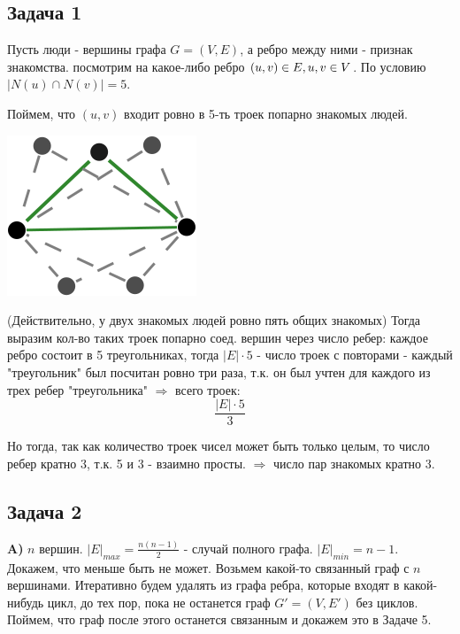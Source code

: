 \documentclass{article}
\begin{document}
\begin{center}
	\subsection*{Задача 1}
\end{center}

Пусть люди - вершины графа $ G = (V, E) $, а ребро между ними - признак знакомства.
посмотрим на какое-либо ребро $ (u, v) \in E, \space u, v \in V $. По условию $ |N(u) \cap N(v)| = 5$.

Поймем, что $ (u, v) $ входит ровно в 5-ть троек попарно знакомых людей.

\includegraphics[scale=0.5]{1_1.png}

(Действительно, у двух знакомых людей ровно пять общих знакомых)
Тогда выразим кол-во таких троек попарно соед. вершин через число ребер: каждое ребро состоит в 5 треугольниках, тогда $|E| \cdot 5$ - число троек с повторами - каждый "треугольник" был посчитан ровно три раза, т.к. он был учтен для каждого из трех ребер "треугольника" $\Rightarrow$ всего троек:
$$ \frac{|E| \cdot 5}{3}$$

Но тогда, так как количество троек чисел может быть только целым, то число ребер кратно 3, т.к. 5 и 3 - взаимно просты. $ \Rightarrow $ число пар знакомых кратно 3.   
 
 \begin{center}
 	\subsection*{Задача 2}
 \end{center}
 
 \textbf{A)} $ n $ вершин. $ |E|_{max} = \frac{n(n - 1)}{2} $ - случай полного графа.
 $ |E|_{min} = n - 1 $. Докажем, что меньше быть не может.
 Возьмем какой-то связанный граф с $ n $ вершинами. Итеративно будем удалять из графа ребра, которые входят в какой-нибудь цикл, до тех пор, пока не останется граф $ G' = (V, E') $ без циклов. Поймем, что граф после этого останется связанным и докажем это в Задаче 5.
 
\end{document}
